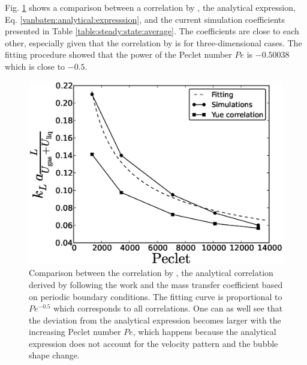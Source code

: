 \documentclass{article}
\begin{document}
Fig. \ref{fig:volume:mass:coefficient} shows a comparison between a correlation by
\citet{yue-mass}, the analytical expression, Eq. \ref{vanbaten:analytical:expresssion}, and the current
simulation coefficients presented in Table
\ref{table:steady:state:average}. The coefficients are close to each other, especially given that
the correlation by \citet{yue-mass} is for three-dimensional cases. The fitting procedure showed
that the power of
the Peclet number $Pe$ is $-0.50038$ which is close to $-0.5$. 
\begin{figure}[htb!]
\includegraphics[width=\textwidth]{Figures/correlations_comparison.eps}
\caption{Comparison between the correlation by \citet{yue-mass}, the analytical correlation derived by following the work
\cite{irandoust} and the mass transfer coefficient based
on periodic boundary conditions. The fitting curve is proportional to $Pe^{-0.5}$ which corresponds
to all correlations. One can as well see that the deviation from the analytical expression becomes
larger with the increasing Peclet number $Pe$, which happens because the analytical expression does
 not account for the velocity pattern and the bubble shape change.\label{fig:volume:mass:coefficient}}
\end{figure}
\end{document}

